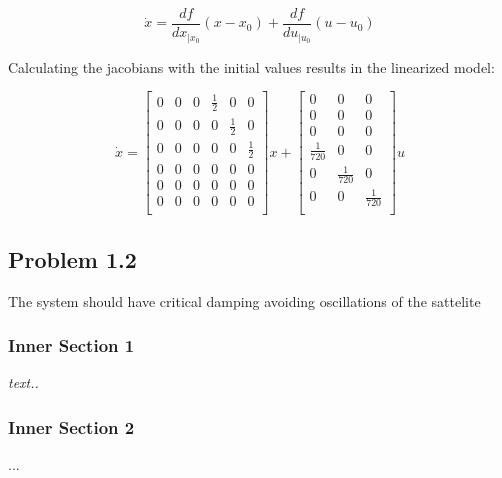 \begin{equation}
    \dot{x} = \frac{df}{dx_{|x_0}}(x-x_0) + \frac{df}{du_{|u_0}}(u-u_0)
\end{equation}

Calculating the jacobians with the initial values results in the linearized model:

\begin{equation}
    \dot{x} = 
    \begin{bmatrix}
        0 & 0 & 0 & \frac{1}{2}  & 0 & 0 \\
        0 & 0 & 0 & 0 & \frac{1}{2}  & 0 \\
        0 & 0 & 0 & 0 & 0 & \frac{1}{2}  \\
        0 & 0 & 0 & 0 & 0 & 0 \\
        0 & 0 & 0 & 0 & 0 & 0 \\
        0 & 0 & 0 & 0 & 0 & 0 \\
    \end{bmatrix}
    x + 
    \begin{bmatrix}
        0 & 0 & 0 \\
        0 & 0 & 0 \\
        0 & 0 & 0 \\
        \frac{1}{720} & 0 & 0 \\
        0 & \frac{1}{720}  & 0 \\
        0 & 0 & \frac{1}{720} \\
    \end{bmatrix}
    u
\end{equation}








\subsection*{Problem 1.2}

The system should have critical damping avoiding oscillations of the sattelite



\subsubsection*{Inner Section 1}
\emph{text..}

\subsubsection*{Inner Section 2}
...

